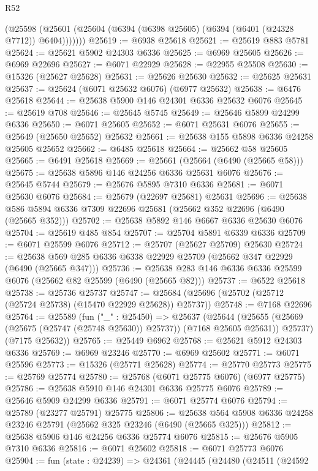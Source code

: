 \begin{lexlean}{R52}
\begin{coremodule}
        (@25598 (@25601 (@25604 (@6394 (@6398 @25605) (@6394 (@6401 (@24328 @7712)) @6404)))))))
@25619 := @6938 @25618
@25621 := @25619 @883 @5781
@25624 := @25621 @5902 @24303 @6336
@25625 := @6969 @25605
@25626 := @6969 @22696
@25627 := @6071 @22929
@25628 := @22955 @25508
@25630 := @15326 (@25627 @25628)
@25631 := @25626 @25630
@25632 := @25625 @25631
@25637 := @25624 (@6071 @25632 @6076) (@6977 @25632)
@25638 := @6476 @25618
@25644 := @25638 @5900 @146 @24301 @6336 @25632 @6076
@25645 := @25619 @708
@25646 := @25645 @5745
@25649 := @25646 @5899 @24299 @6336
@25650 := @6071 @25605
@25652 := @6071 @25631 @6076
@25655 := @25649 (@25650 @25652) @25632
@25661 := @25638 @155 @5898 @6336 @24258 @25605 @25652
@25662 := @6485 @25618
@25664 := @25662 @58 @25605
@25665 := @6491 @25618
@25669 := @25661 (@25664 (@6490 (@25665 @58)))
@25675 := @25638 @5896 @146 @24256 @6336 @25631 @6076
@25676 := @25645 @5744
@25679 := @25676 @5895 @7310 @6336
@25681 := @6071 @25630 @6076
@25684 := @25679 (@22697 @25681) @25631
@25696 := @25638 @586 @5894 @6336 @7309 @22696 @25681 (@25662 @352 @22696 (@6490 (@25665 @352)))
@25702 := @25638 @5892 @146 @6667 @6336 @25630 @6076
@25704 := @25619 @485 @854
@25707 := @25704 @5891 @6339 @6336
@25709 := @6071 @25599 @6076
@25712 := @25707 (@25627 @25709) @25630
@25724 := @25638 @569 @285 @6336 @6338 @22929 @25709 (@25662 @347 @22929 (@6490 (@25665 @347)))
@25736 := @25638 @283 @146 @6336 @6336 @25599 @6076 (@25662 @82 @25599 (@6490 (@25665 @82)))
@25737 := @6522 @25618
@25738 := @25736 @25737
@25747 := @25684 (@25696 (@25702 (@25712 (@25724 @25738) (@15470 @22929 @25628)) @25737))
@25748 := @7168 @22696
@25764 := @25589
    (fun ("_" : @25450) =>
    @25637
      (@25644
        (@25655 (@25669 (@25675 (@25747 (@25748 @25630)) @25737)) (@7168 @25605 @25631))
        @25737)
      (@7175 @25632))
@25765 := @25449 @6962
@25768 := @25621 @5912 @24303 @6336
@25769 := @6969 @23246
@25770 := @6969 @25602
@25771 := @6071 @25596
@25773 := @15326 (@25771 @25628)
@25774 := @25770 @25773
@25775 := @25769 @25774
@25780 := @25768 (@6071 @25775 @6076) (@6977 @25775)
@25786 := @25638 @5910 @146 @24301 @6336 @25775 @6076
@25789 := @25646 @5909 @24299 @6336
@25791 := @6071 @25774 @6076
@25794 := @25789 (@23277 @25791) @25775
@25806 := @25638 @564 @5908 @6336 @24258 @23246 @25791 (@25662 @325 @23246 (@6490 (@25665 @325)))
@25812 := @25638 @5906 @146 @24256 @6336 @25774 @6076
@25815 := @25676 @5905 @7310 @6336
@25816 := @6071 @25602
@25818 := @6071 @25773 @6076
@25904 := fun (state : @24239) =>
  @24361
    (@24445
      (@24480
        (@24511
          (@24592

\end{coremodule}
\end{lexlean}
